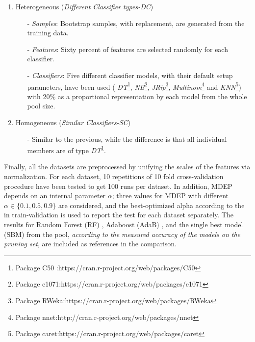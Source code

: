 \begin{enumerate}[nosep]
    \item Heterogeneous  (\textit{Different Classifier types-DC})
       \begin{itemize}[nosep]
           \item[-] \textit{Samples}: Bootstrap samples, with replacement, are generated from the training data.
           \item[-] \textit{Features}: Sixty percent of features are selected randomly for each classifier.
           \item[-] \textit{Classifiers}: Five different classifier models, with their default setup parameters, have been used  ( \textit{DT}\footnote{Package C50 :https://cran.r-project.org/web/packages/C50\label{Decisiont}}, \textit{NB}\footnote{Package e1071:https://cran.r-project.org/web/packages/e1071}, \textit{JRip}\footnote{Package RWeka:https://cran.r-project.org/web/packages/RWeka}, \textit{Multinom}\footnote{Package nnet:http://cran.r-project.org/web/packages/nnet} and \textit{KNN}\footnote{Package caret:https://cran.r-project.org/web/packages/caret}) with 20\% as a proportional representation by each model  from the whole pool size.
       \end{itemize}
    \item Homogeneous  (\textit{Similar Classifiers-SC})
     \begin{itemize}[nosep]
         \item[-] Similar to the previous, while the difference is that all individual members are of type \textit{DT}\textsuperscript{\ref{Decisiont}}. 
     \end{itemize}
\end{enumerate} 




Finally, all the datasets are preprocessed by unifying the scales of the features via normalization. For each dataset, 10 repetitions of 10 fold cross-validation procedure have been tested to get 100 runs per dataset. In addition, MDEP depends on an internal parameter $\alpha$; three values for MDEP with different $\alpha \in \{0.1, 0.5,0.9\}$ are considered, and the best-optimized alpha according to the in train-validation is used to report the test for each dataset separately. The results for Random Forest (RF) \cite{breiman2001}, Adaboost (AdaB) \cite{freund1997}, and the single best model (SBM)  from the pool, \textit{according to the measured accuracy of the models on the pruning set}, are included as references in the comparison.     

